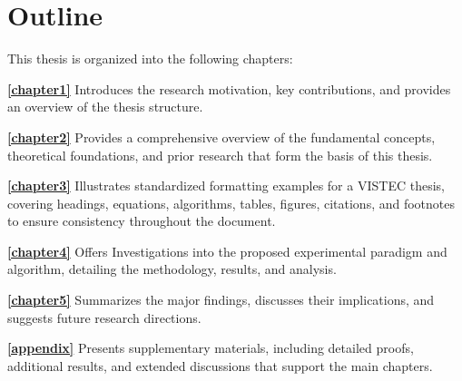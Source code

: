 \section{Outline}
\label{ch1:sec:outline}
\begin{paragraph}
This thesis is organized into the following chapters:

\textbf{\autoref{chapter1}}  
Introduces the research motivation, key contributions, and provides an overview of the thesis structure.

\textbf{\autoref{chapter2}}  
Provides a comprehensive overview of the fundamental concepts, theoretical foundations, and prior research that form the basis of this thesis.

\textbf{\autoref{chapter3}}  
Illustrates standardized formatting examples for a VISTEC thesis, covering headings, equations, algorithms, tables, figures, citations, and footnotes to ensure consistency throughout the document.

\textbf{\autoref{chapter4}}  
Offers Investigations into the proposed experimental paradigm and algorithm, detailing the methodology, results, and analysis.

\textbf{\autoref{chapter5}}  
Summarizes the major findings, discusses their implications, and suggests future research directions.

\textbf{\autoref{appendix}}  
Presents supplementary materials, including detailed proofs, additional results, and extended discussions that support the main chapters.
\end{paragraph}